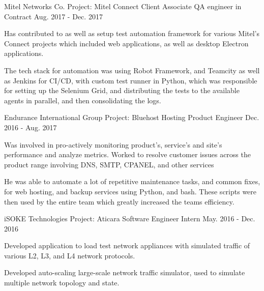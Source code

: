 \begin{cventries}
	\cventry
		{ Mitel Networks Co. } %
		{ Project: Mitel Connect Client } %
		{ Associate QA engineer in Contract } %
		{ Aug. 2017 - Dec. 2017 } %
		{
			\begin{cvitems} %
				\item { Has contributed to as well as setup test automation framework for various Mitel's Connect projects which included web applications, as well as desktop Electron applications.}
				\item { The tech stack for automation was using Robot Framework, and Teamcity as well as Jenkins for CI/CD, with custom test runner in Python, which was responsible for setting up the Selenium Grid, and distributing the tests to the available agents in parallel, and then consolidating the logs. } 
			\end{cvitems}
		}

  \cventry
    { Endurance International Group } %
    { Project: Bluehost }
    { Hosting Product Engineer } %
    { Dec. 2016 - Aug. 2017 } %
    {
      \begin{cvitems} %
        \item { Was involved in pro-actively monitoring product's, service's and site's performance and analyze metrics. Worked to resolve customer issues across the product range involving DNS, SMTP, CPANEL, and other services }
        \item { He was able to automate a lot of repetitive maintenance tasks, and common fixes, for web hosting, and backup services using Python, and bash. These scripts were then used by the entire team which greatly increased the teams efficiency. }
      \end{cvitems}
    }

  \cventry
    {iSOKE Technologies } %
    {Project: Aticara }
    {Software Engineer Intern} %
    {May. 2016 - Dec. 2016} %
    {
      \begin{cvitems} %
        \item {Developed application to load test network appliances with simulated traffic of various L2, L3, and L4 network protocols.}
        \item {Developed auto-scaling large-scale network traffic simulator, used to simulate multiple network topology and state.}
      \end{cvitems}
    }
\end{cventries}
